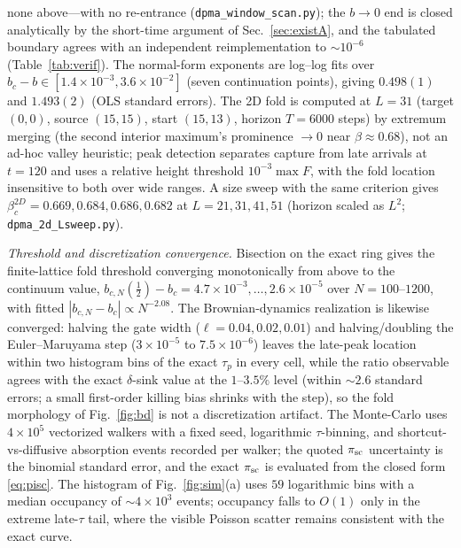 \documentclass[reprint,amsmath,amssymb,aps,prresearch,longbibliography]{revtex4-2}
\begin{document}
none above---with no re-entrance (\texttt{dpma\_window\_scan.py}); the $b\to0$ end is closed
analytically by the short-time argument of Sec.~\ref{sec:existA}, and the tabulated boundary agrees
with an independent reimplementation to $\sim10^{-6}$ (Table~\ref{tab:verif}). The normal-form
exponents are log--log fits over $b_c-b\in[1.4\times10^{-3},3.6\times10^{-2}]$ (seven continuation
points), giving $0.498(1)$ and $1.493(2)$ (OLS standard errors). The 2D fold is computed at
$L=31$ (target $(0,0)$, source $(15,15)$, start $(15,13)$, horizon $T=6000$ steps) by extremum
merging (the second interior maximum's prominence $\to0$ near $\beta\approx0.68$),
not an ad-hoc valley heuristic; peak detection separates capture from late arrivals at $t=120$ and
uses a relative height threshold $10^{-3}\max F$, with the fold location insensitive to both over
wide ranges. A size sweep with the same criterion gives
$\beta_c^{2D}=0.669,0.684,0.686,0.682$ at $L=21,31,41,51$ (horizon scaled as $L^2$;
\texttt{dpma\_2d\_Lsweep.py}).

\emph{Threshold and discretization convergence.} Bisection on the exact ring gives the
finite-lattice fold threshold converging monotonically from above to the continuum value,
$b_{c,N}(\tfrac12)-b_c=4.7\times10^{-3},\dots,2.6\times10^{-5}$ over $N=100$--$1200$, with fitted
$|b_{c,N}-b_c|\propto N^{-2.08}$. The Brownian-dynamics realization is likewise converged: halving
the gate width ($\ell=0.04,0.02,0.01$) and halving/doubling the Euler--Maruyama step
($3\times10^{-5}$ to $7.5\times10^{-6}$) leaves the late-peak location within two histogram bins of
the exact $\tau_p$ in every cell, while the ratio observable agrees with the exact $\delta$-sink
value at the $1$--$3.5\%$ level (within $\sim2.6$ standard errors; a small first-order killing bias
shrinks with the step), so the fold morphology of Fig.~\ref{fig:bd} is not a discretization
artifact. The Monte-Carlo uses $4\times10^5$ vectorized walkers with a fixed
seed, logarithmic $\tau$-binning, and shortcut-vs-diffusive absorption events recorded per walker; the
quoted $\pi_{\rm sc}$ uncertainty is the binomial standard error, and the exact $\pi_{\rm sc}$ is
evaluated from the closed form \eqref{eq:pisc}. The histogram of Fig.~\ref{fig:sim}(a) uses $59$
logarithmic bins with a median occupancy of $\sim4\times10^{3}$ events; occupancy falls to $O(1)$
only in the extreme late-$\tau$ tail, where the visible Poisson scatter remains consistent with the
exact curve.
\end{document}
